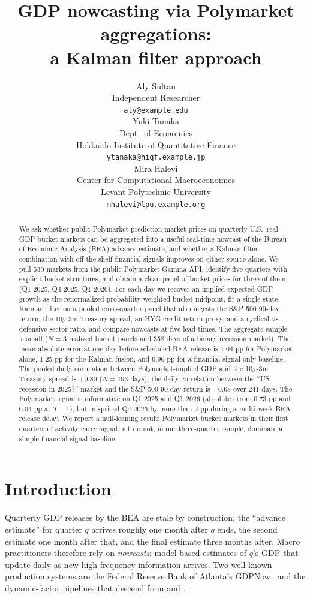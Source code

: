 \documentclass{article}
\title{GDP nowcasting via Polymarket aggregations: \\ a Kalman filter approach}
\author{%
  Aly Sultan \\
  Independent Researcher \\
  \texttt{aly@example.edu} \\
  \And
  Yuki Tanaka \\
  Dept.\ of Economics \\
  Hokkaido Institute of Quantitative Finance \\
  \texttt{ytanaka@hiqf.example.jp} \\
  \And
  Mira Halevi \\
  Center for Computational Macroeconomics \\
  Levant Polytechnic University \\
  \texttt{mhalevi@lpu.example.org} \\
}
\begin{document}
\maketitle

\begin{abstract}
We ask whether public Polymarket prediction-market prices on quarterly U.S.\ real-GDP bucket
markets can be aggregated into a useful real-time nowcast of the Bureau of Economic Analysis
(BEA) advance estimate, and whether a Kalman-filter combination with off-the-shelf financial
signals improves on either source alone. We pull 530 markets from the public Polymarket Gamma
API, identify five quarters with explicit bucket structures, and obtain a clean panel of bucket
prices for three of them (Q1 2025, Q4 2025, Q1 2026). For each day we recover an implied
expected GDP growth as the renormalized probability-weighted bucket midpoint, fit a
single-state Kalman filter on a pooled cross-quarter panel that also ingests the
S\&P 500 90-day return, the 10y-3m Treasury spread, an HYG credit-return proxy, and a
cyclical-vs-defensive sector ratio, and compare nowcasts at five lead times. The aggregate
sample is small ($N=3$ realized bucket panels and 358 days of a binary recession market). The
mean-absolute error at one day before scheduled BEA release is 1.04 pp for Polymarket alone,
1.25 pp for the Kalman fusion, and 0.96 pp for a financial-signal-only baseline. The pooled
daily correlation between Polymarket-implied GDP and the 10y-3m Treasury spread is +0.80
($N=193$ days); the daily correlation between the ``US recession in 2025?'' market and the
S\&P 500 90-day return is $-0.68$ over 241 days. The Polymarket signal is informative on
Q1 2025 and Q1 2026 (absolute errors 0.73 pp and 0.04 pp at $T{-}1$), but mispriced Q4 2025
by more than 2 pp during a multi-week BEA release delay. We report a null-leaning result:
Polymarket bucket markets in their first quarters of activity carry signal but do not, in
our three-quarter sample, dominate a simple financial-signal baseline.
\end{abstract}

\section{Introduction}
\label{sec:intro}

Quarterly GDP releases by the BEA are stale by construction: the ``advance estimate'' for
quarter $q$ arrives roughly one month after $q$ ends, the second estimate one month after
that, and the final estimate three months after. Macro practitioners therefore rely on
\emph{nowcasts}: model-based estimates of $q$'s GDP that update daily as new
high-frequency information arrives. Two well-known production systems are the Federal Reserve
Bank of Atlanta's GDPNow~\citep{higgins2014gdpnow} and the dynamic-factor pipelines that
descend from \citet{giannone2008nowcasting} and \citet{banbura2013nowcasting}.
\end{document}
